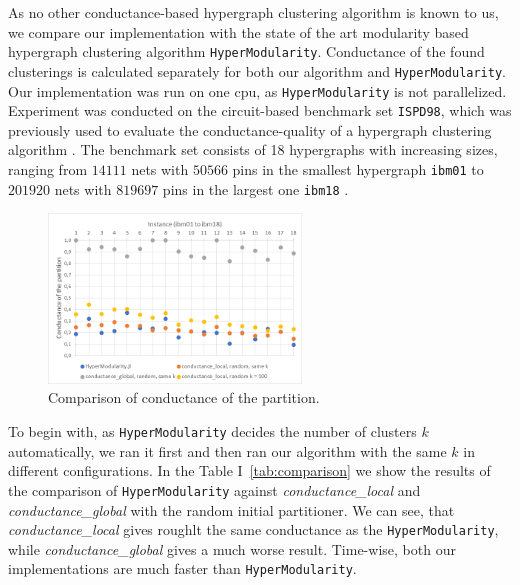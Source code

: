 \documentclass[acmsmall,nonacm,screen,review]{acmart}
\begin{document}
\par As no other conductance-based hypergraph clustering algorithm is known to us, we 
compare our implementation with the state of the art modularity based hypergraph 
clustering algorithm \texttt{HyperModularity}. Conductance of the found 
clusterings is calculated separately for both our algorithm and 
\texttt{HyperModularity}. Our implementation was run on one cpu, as 
\texttt{HyperModularity} is not parallelized. Experiment was conducted on the
circuit-based benchmark set \texttt{ISPD98}, which was
previously used to evaluate the conductance-quality of a hypergraph clustering
algorithm \cite{HyperSF}. The benchmark set consists of 18 hypergraphs with
increasing sizes, ranging from  $14 111$ nets with $50 566$ pins in the smallest
hypergraph \texttt{ibm01} to $201 920$ nets with $819 697$ pins in the largest
one \texttt{ibm18} \cite{IBMBenchmark}.

\begin{figure}
    \centering
    \includegraphics[width=0.6\textwidth]{conductance_comparison.png}
    \caption{Comparison of conductance of the partition.}
    \label{fig:conductance}
\end{figure}

To begin with, as \texttt{HyperModularity} decides the number of clusters $k$ 
automatically, we ran it first and then ran our algorithm with the same $k$ in 
different configurations. In the Table I~\ref{tab:comparison} we show the results 
of the comparison of \texttt{HyperModularity} against \textit{conductance\_local} 
and \textit{conductance\_global} with the random initial partitioner. We can see,
that \textit{conductance\_local} gives roughlt the same conductance as 
the \texttt{HyperModularity}, while \textit{conductance\_global} gives a much worse
result. Time-wise, both our implementations are much faster than 
\texttt{HyperModularity}.
\end{document}
